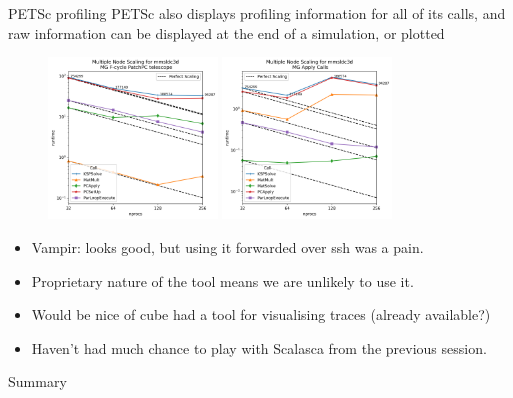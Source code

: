 \documentclass[pdf,aspectratio=169]{beamer}
\begin{document}
\begin{frame}{PETSc profiling}
PETSc also displays profiling information for all of its calls, and raw information can be displayed at the end of a simulation, or plotted
\begin{figure}
	\includegraphics[width=0.4\textwidth]{main_stage.png}
	\includegraphics[width=0.4\textwidth]{mgapply.png}
\end{figure}
\end{frame}

\begin{frame}
\begin{itemize}
	\item Vampir: looks good, but using it forwarded over ssh was a pain.
	\item Proprietary nature of the tool means we are unlikely to use it.
	\item Would be nice of cube had a tool for visualising traces (already available?)
	\item Haven't had much chance to play with Scalasca from the previous session.
\end{itemize}


\end{frame}

\begin{frame}{Summary}
	
\end{frame}
\end{document}

